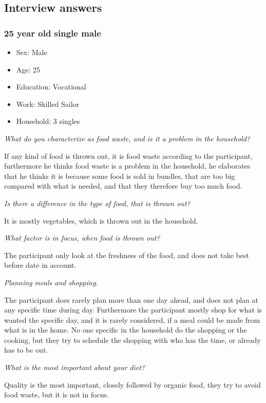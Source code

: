 \subsection{Interview answers}
\subsubsection{25 year old single male}
\begin{itemize}
  \item Sex: Male
  \item Age: 25
  \item Education: Vocational
  \item Work: Skilled Sailor
  \item Household: 3 singles
\end{itemize}
\emph{What do you characterize as food waste, and is it a problem in the household?}

If any kind of food is thrown out, it is food waste according to the participant, furthermore he thinks food waste is a problem in the household, he elaborates that he thinks it is because some food is sold in bundles, that are too big compared with what is needed, and that they therefore buy too much food.

\emph{Is there a difference in the type of food, that is thrown out?}

It is mostly vegetables, which is thrown out in the household.

\emph{What factor is in focus, when food is thrown out?}

The participant only look at the freshness of the food, and does not take best before date in account.

\emph{Planning meals and shopping.}

The participant does rarely plan more than one day ahead, and does not plan at any specific time during day. Furthermore the participant mostly shop for what is wanted the specific day, and it is rarely considered, if a meal could be made from what is in the home. No one specific in the household do the shopping or the cooking, but they try to schedule the shopping with who has the time, or already has to be out.

\emph{What is the most important about your diet?}

Quality is the most important, closely followed by organic food, they try to avoid food waste, but it is not in focus.


